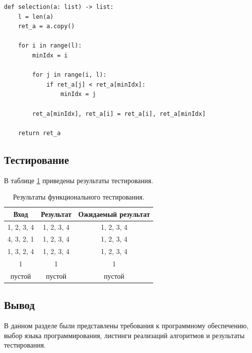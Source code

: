 \documentclass[14pt,russian]{scrartcl}
\begin{document}
\begin{center}
\captionsetup{justification=raggedright, singlelinecheck=off}
\begin{lstlisting}[label=list:selection, caption=Функция сортировки массива методом выбора]
def selection(a: list) -> list:
    l = len(a)
    ret_a = a.copy()

    for i in range(l):
        minIdx = i

        for j in range(i, l):
            if ret_a[j] < ret_a[minIdx]:
                minIdx = j

        ret_a[minIdx], ret_a[i] = ret_a[i], ret_a[minIdx]

    return ret_a
\end{lstlisting}
\end{center}

\clearpage

\subsection{Тестирование}

В таблице \ref{tab:tests} приведены результаты тестирования.\\

\begin{table}[h]
    \caption{\centering Результаты функционального тестирования.}
    \centering
    \begin{tabular}{|c|c|c|}
    \hline
    Вход       & Результат  & Ожидаемый результат \\ \hline
    1, 2, 3, 4 & 1, 2, 3, 4 & 1, 2, 3, 4          \\ \hline
    4, 3, 2, 1 & 1, 2, 3, 4 & 1, 2, 3, 4          \\ \hline
    1, 3, 2, 4 & 1, 2, 3, 4 & 1, 2, 3, 4          \\ \hline
    1 & 1 & 1         \\ \hline
    пустой     & пустой     & пустой              \\ \hline
    \end{tabular}
    \label{tab:tests}
\end{table}


\subsection{Вывод}

В данном разделе были представлены требования к программному обеспечению, выбор языка программирования, листинги реализаций алгоритмов и результаты тестирования.
\end{document}
